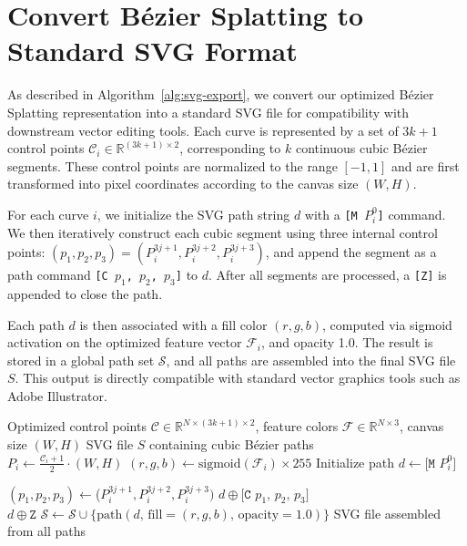 
\section{Convert Bézier Splatting to Standard SVG Format}


As described in Algorithm~\ref{alg:svg-export}, we convert our optimized Bézier Splatting representation into a standard SVG file for compatibility with downstream vector editing tools.
Each curve is represented by a set of $3k + 1$ control points $\mathcal{C}_i \in \mathbb{R}^{(3k+1) \times 2}$, corresponding to $k$ continuous cubic Bézier segments.
These control points are normalized to the range $[-1, 1]$ and are first transformed into pixel coordinates according to the canvas size $(W, H)$.

For each curve $i$, we initialize the SVG path string $d$ with a \texttt{[M $P_i^0$]} command.
We then iteratively construct each cubic segment using three internal control points:
$(p_1, p_2, p_3) = (P_i^{3j+1}, P_i^{3j+2}, P_i^{3j+3})$,
and append the segment as a path command \texttt{[C $p_1$, $p_2$, $p_3$]} to $d$.
After all segments are processed, a \texttt{[Z]} is appended to close the path.

Each path $d$ is then associated with a fill color $(r, g, b)$, computed via sigmoid activation on the optimized feature vector $\mathcal{F}_i$, and opacity 1.0.
The result is stored in a global path set $\mathcal{S}$, and all paths are assembled into the final SVG file $S$.
This output is directly compatible with standard vector graphics tools such as Adobe Illustrator.

\begin{algorithm}[!h]
   \caption{\textbf{Convert Bézier Splatting to Standard SVG}}
   \label{alg:svg-export}
\begin{algorithmic}
    Optimized control points $\mathcal{C} \in \mathbb{R}^{N \times (3k+1) \times 2}$, feature colors $\mathcal{F} \in \mathbb{R}^{N \times 3}$, canvas size $(W, H)$
    SVG file $S$ containing cubic Bézier paths \\
   \STATE $P_i \leftarrow \frac{\mathcal{C}_i + 1}{2} \cdot (W, H)$
    \STATE $(r, g, b) \leftarrow \text{sigmoid}(\mathcal{F}_i) \times 255$
    \STATE Initialize path $d \leftarrow \texttt{[M $P_i^0$]}$

    \STATE $(p_1, p_2, p_3) \leftarrow $($P_i^{3j + 1}, P_i^{3j + 2}, P_i^{3j + 3})$\;
    \STATE $d \oplus \texttt{[C $p_1$, $p_2$, $p_3$]}$ \\
    \ENDFOR
    \STATE $d \oplus \texttt{Z}$\;
    \STATE $\mathcal{S} \leftarrow \mathcal{S} \cup \{ \text{path}(d,\, \text{fill} = (r, g, b),\, \text{opacity} = 1.0) \}$
    \ENDFOR
    SVG file assembled from all paths
\end{algorithmic}
\end{algorithm}

